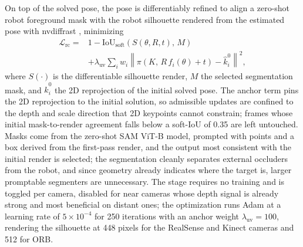 On top of the solved pose, the pose is differentiably refined to align a zero-shot robot foreground mask with the robot silhouette rendered from the estimated pose with nvdiffrast \cite{kirillov2023segment,laine2020modular}, minimizing
\begin{equation}
\begin{split}
\mathcal{L}_{\text{rc}} ={}& 1 - \mathrm{IoU}_{\text{soft}}\!\left(S(\theta, R, t),\, M\right) \\
&+ \lambda_{\text{uv}} \sum_{i} w_i \left\| \pi\!\left(K,\, R\, f_i(\theta) + t\right) - \hat{k}^{0}_{i} \right\|^{2},
\end{split}
\end{equation}
where $S(\cdot)$ is the differentiable silhouette render, $M$ the selected segmentation mask, and $\hat{k}^{0}_{i}$ the 2D reprojection of the initial solved pose. The anchor term pins the 2D reprojection to the initial solution, so admissible updates are confined to the depth and scale direction that 2D keypoints cannot constrain; frames whose initial mask-to-render agreement falls below a soft-IoU of 0.35 are left untouched. Masks come from the zero-shot SAM ViT-B model, prompted with points and a box derived from the first-pass render, and the output most consistent with the initial render is selected; the segmentation cleanly separates external occluders from the robot, and since geometry already indicates where the target is, larger promptable segmenters are unnecessary. The stage requires no training and is toggled per camera, disabled for near cameras whose depth signal is already strong and most beneficial on distant ones; the optimization runs Adam at a learning rate of $5\times10^{-4}$ for 250 iterations with an anchor weight $\lambda_{\text{uv}}=100$, rendering the silhouette at 448 pixels for the RealSense and Kinect cameras and 512 for ORB.

